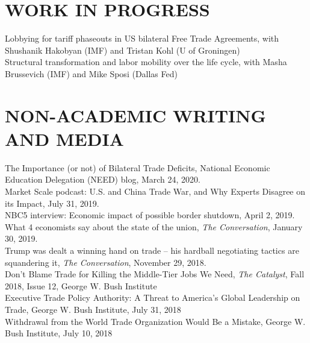 \documentclass[11pt]{res}
\begin{document}
\begin{resume}
\section{WORK IN PROGRESS}\vspace{1.5mm}
Lobbying for tariff phaseouts in US bilateral Free Trade Agreements, with Shushanik Hakobyan (IMF) and Tristan Kohl (U of Groningen)\vspace{1.5mm}\\
Structural transformation and labor mobility over the life cycle, with Masha Brussevich (IMF) and Mike Sposi (Dallas Fed)


\section{NON-ACADEMIC WRITING AND MEDIA}\vspace{1.5mm}
The Importance (or not) of Bilateral Trade Deficits, National Economic Education Delegation (NEED) blog, March 24, 2020.\vspace{1.5mm}\\
Market Scale podcast: U.S. and China Trade War, and Why Experts Disagree on its Impact, July 31, 2019.\vspace{1.5mm}\\
NBC5 interview: Economic impact of possible border shutdown, April 2, 2019.\vspace{1.5mm}\\
What 4 economists say about the state of the union, \emph{The Conversation}, January 30, 2019.\vspace{7mm}\\
Trump was dealt a winning hand on trade – his hardball negotiating tactics are squandering it, \emph{The Conversation}, November 29, 2018.\vspace{1.5mm}\\
Don't Blame Trade for Killing the Middle-Tier Jobs We Need, \emph{The Catalyst}, Fall 2018, Issue 12, George W. Bush Institute\vspace{1.5mm}\\
Executive Trade Policy Authority: A Threat to America’s Global Leadership on Trade, George W. Bush Institute, July 31, 2018\vspace{1.5mm}\\
Withdrawal from the World Trade Organization Would Be a Mistake, George W. Bush Institute, July 10, 2018






\end{resume}
\end{document}
